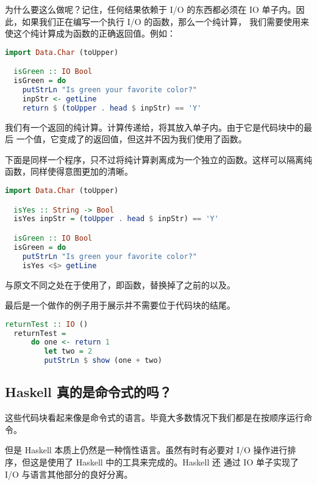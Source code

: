 \documentclass[./main.tex]{subfiles}
\begin{document}
为什么要这么做呢？记住，任何结果依赖于 I/O 的东西都必须在 IO 单子内。因此，如果我们正在编写一个执行 I/O 的函数，那么一个纯计算，
我们需要使用来使这个纯计算成为函数的正确返回值。例如：

\begin{lstlisting}[language=Haskell]
  import Data.Char (toUpper)

  isGreen :: IO Bool
  isGreen = do
    putStrLn "Is green your favorite color?"
    inpStr <- getLine
    return $ (toUpper . head $ inpStr) == 'Y'
\end{lstlisting}

我们有一个返回的纯计算。计算传递给，将其放入单子内。由于它是代码块中的最后
一个值，它变成了的返回值，但这并不因为我们使用了函数。

下面是同样一个程序，只不过将纯计算剥离成为一个独立的函数。这样可以隔离纯函数，同样使得意图更加的清晰。

\begin{lstlisting}[language=Haskell]
  import Data.Char (toUpper)

  isYes :: String -> Bool
  isYes inpStr = (toUpper . head $ inpStr) == 'Y'

  isGreen :: IO Bool
  isGreen = do
    putStrLn "Is green your favorite color?"
    isYes <$> getLine
\end{lstlisting}

与原文不同之处在于使用了\acode{<\$>}，即函数，替换掉了之前的以及。

最后是一个做作的例子用于展示并不需要位于代码块的结尾。

\begin{lstlisting}[language=Haskell]
  returnTest :: IO ()
  returnTest =
      do one <- return 1
         let two = 2
         putStrLn $ show (one + two)
\end{lstlisting}

\subsection*{Haskell 真的是命令式的吗？}

这些代码块看起来像是命令式的语言。毕竟大多数情况下我们都是在按顺序运行命令。

但是 Haskell 本质上仍然是一种惰性语言。虽然有时有必要对 I/O 操作进行排序，但这是使用了 Haskell 中的工具来完成的。Haskell 还
通过 IO 单子实现了 I/O 与语言其他部分的良好分离。
\end{document}
